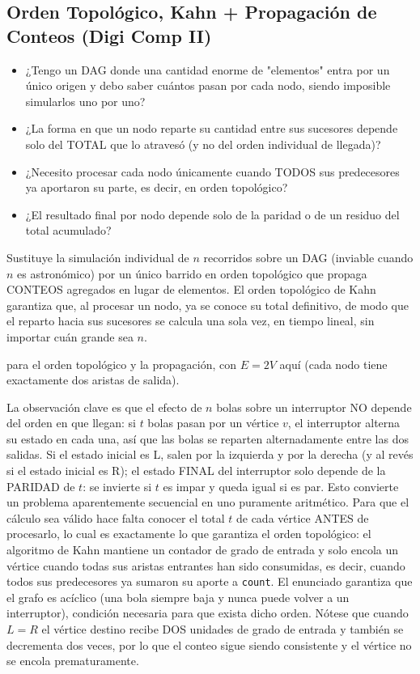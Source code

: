 \subsection{Orden Topológico, Kahn + Propagación de Conteos (Digi Comp II)}
\label{alg:4-8}


\begin{itemize}
\item ¿Tengo un DAG donde una cantidad enorme de "elementos" entra por un único origen y debo saber cuántos pasan por cada nodo, siendo imposible simularlos uno por uno?
\item ¿La forma en que un nodo reparte su cantidad entre sus sucesores depende solo del TOTAL que lo atravesó (y no del orden individual de llegada)?
\item ¿Necesito procesar cada nodo únicamente cuando TODOS sus predecesores ya aportaron su parte, es decir, en orden topológico?
\item ¿El resultado final por nodo depende solo de la paridad o de un residuo del total acumulado?
\end{itemize}

 Sustituye la simulación individual de $n$ recorridos sobre un DAG (inviable cuando $n$ es astronómico) por un único barrido en orden topológico que propaga CONTEOS agregados en lugar de elementos. El orden topológico de Kahn garantiza que, al procesar un nodo, ya se conoce su total definitivo, de modo que el reparto hacia sus sucesores se calcula una sola vez, en tiempo lineal, sin importar cuán grande sea $n$.

  para el orden topológico y la propagación, con $E = 2V$ aquí (cada nodo tiene exactamente dos aristas de salida).

 La observación clave es que el efecto de $n$ bolas sobre un interruptor NO depende del orden en que llegan: si $t$ bolas pasan por un vértice $v$, el interruptor alterna su estado en cada una, así que las bolas se reparten alternadamente entre las dos salidas. Si el estado inicial es L, salen  por la izquierda y  por la derecha (y al revés si el estado inicial es R); el estado FINAL del interruptor solo depende de la PARIDAD de $t$: se invierte si $t$ es impar y queda igual si es par. Esto convierte un problema aparentemente secuencial en uno puramente aritmético. Para que el cálculo sea válido hace falta conocer el total $t$ de cada vértice ANTES de procesarlo, lo cual es exactamente lo que garantiza el orden topológico: el algoritmo de Kahn mantiene un contador de grado de entrada y solo encola un vértice cuando todas sus aristas entrantes han sido consumidas, es decir, cuando todos sus predecesores ya sumaron su aporte a \texttt{count}. El enunciado garantiza que el grafo es acíclico (una bola siempre baja y nunca puede volver a un interruptor), condición necesaria para que exista dicho orden. Nótese que cuando $L = R$ el vértice destino recibe DOS unidades de grado de entrada y también se decrementa dos veces, por lo que el conteo sigue siendo consistente y el vértice no se encola prematuramente.~\cite{kahn1962}

